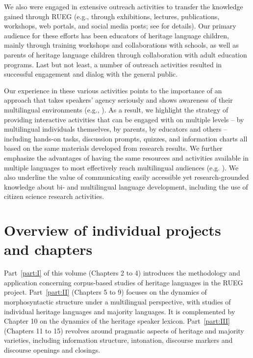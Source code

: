 \documentclass[output=paper,colorlinks,citecolor=brown]{langscibook}
\begin{document}
\begin{sloppypar}
We also were engaged in extensive outreach activities to transfer the knowledge gained through RUEG (e.g., through exhibitions, lectures, publications, workshops, web portals, and social media posts; see  for details). Our primary audience for these efforts has been educators of heritage language children, mainly through training workshops and collaborations with schools, as well as parents of heritage language children through collaboration with adult education programs. Last but not least, a number of outreach activities resulted in successful engagement and dialog with the general public.
\end{sloppypar}

Our experience in these various activities points to the importance of an approach that takes speakers’ agency seriously and shows awareness of their multilingual environments (e.g., \citealt{Bunk_subm, Bunk_iprep, TauschTsehaye2023}). As a result, we highlight the strategy of providing interactive activities that can be engaged with on multiple levels – by multilingual individuals themselves, by parents, by educators and others – including hands-on tasks, discussion prompts, quizzes, and information charts all based on the same materials developed from research results. We further emphasize the advantages of having the same resources and activities available in multiple languages to most effectively reach multilingual audiences (e.g. \citealt{PurkarthoferEtAl2023}). We also underline the value of communicating easily accessible yet research-grounded knowledge about bi- and multilingual language development, including the use of citizen science research activities.



\section{Overview of individual projects and chapters} \label{sec:introwieseetal:overview_chapters}

Part~\ref{part:I} of this volume (Chapters 2 to 4) introduces the methodology and application concerning corpus-based studies of heritage languages in the RUEG project. Part~\ref{part:II} (Chapters 5 to 9) focuses on the dynamics of morphosyntactic structure under a multilingual perspective, with studies of individual heritage languages and majority languages. It is complemented by Chapter 10 on the dynamics of the heritage speaker lexicon. Part~\ref{part:III} (Chapters 11 to 15) revolves around pragmatic aspects of heritage and majority varieties, including information structure, intonation, discourse markers and discourse openings and closings.
\end{document}

